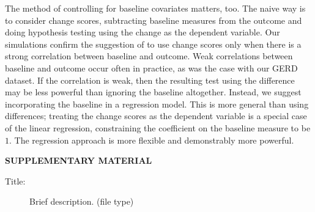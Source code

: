 \documentclass[12pt]{article}
\begin{document}
The method of controlling for baseline covariates matters, too.
The naive way is to consider change scores, subtracting baseline measures from the outcome and doing hypothesis testing using the change as the dependent variable.
Our simulations confirm the suggestion of \cite{frison_repeated_1992} to use change scores only when there is a strong correlation between baseline and outcome.
Weak correlations between baseline and outcome occur often in practice, as was the case with our GERD dataset.
If the correlation is weak, then the resulting test using the difference may be less powerful than ignoring the baseline altogether.
Instead, we suggest incorporating the baseline in a regression model.
This is more general than using differences;
treating the change scores as the dependent variable is a special case of the linear regression, constraining the coefficient on the baseline measure to be $1$.
The regression approach is more flexible and demonstrably more powerful.



\bigskip
\begin{center}
{\large\bf SUPPLEMENTARY MATERIAL}
\end{center}

\begin{description}

\item[Title:] Brief description. (file type)

\end{description}




\end{document}
